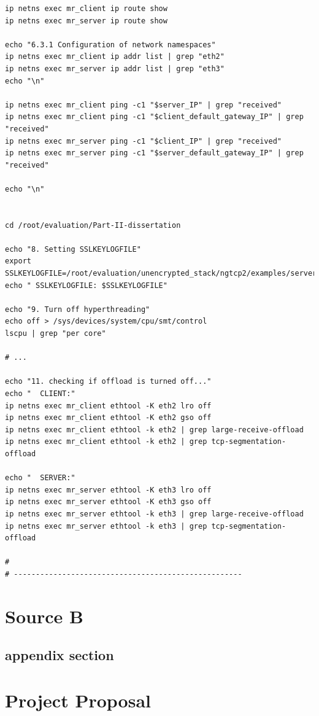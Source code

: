 \documentclass[12pt,a4paper,twoside,openright]{report}
\begin{document}
\begin{verbatim}
ip netns exec mr_client ip route show
ip netns exec mr_server ip route show

echo "6.3.1 Configuration of network namespaces"
ip netns exec mr_client ip addr list | grep "eth2"
ip netns exec mr_server ip addr list | grep "eth3"
echo "\n"

ip netns exec mr_client ping -c1 "$server_IP" | grep "received"
ip netns exec mr_client ping -c1 "$client_default_gateway_IP" | grep "received"
ip netns exec mr_server ping -c1 "$client_IP" | grep "received"
ip netns exec mr_server ping -c1 "$server_default_gateway_IP" | grep "received"

echo "\n"


cd /root/evaluation/Part-II-dissertation

echo "8. Setting SSLKEYLOGFILE"
export SSLKEYLOGFILE=/root/evaluation/unencrypted_stack/ngtcp2/examples/server.key
echo " SSLKEYLOGFILE: $SSLKEYLOGFILE"

echo "9. Turn off hyperthreading"
echo off > /sys/devices/system/cpu/smt/control
lscpu | grep "per core"

# ...

echo "11. checking if offload is turned off..."
echo "  CLIENT:"
ip netns exec mr_client ethtool -K eth2 lro off
ip netns exec mr_client ethtool -K eth2 gso off
ip netns exec mr_client ethtool -k eth2 | grep large-receive-offload
ip netns exec mr_client ethtool -k eth2 | grep tcp-segmentation-offload

echo "  SERVER:"
ip netns exec mr_server ethtool -K eth3 lro off
ip netns exec mr_server ethtool -K eth3 gso off
ip netns exec mr_server ethtool -k eth3 | grep large-receive-offload
ip netns exec mr_server ethtool -k eth3 | grep tcp-segmentation-offload

#
# ----------------------------------------------------

\end{verbatim}

\chapter{Source B}

    \section{appendix section}\label{referencedAppendixTag}


\chapter{Project Proposal}


 
\end{document}
